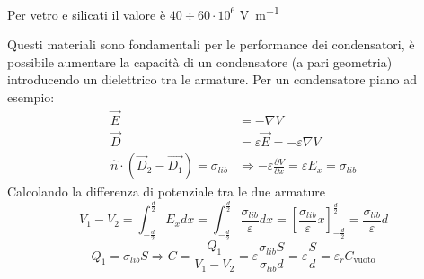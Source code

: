 Per vetro e silicati il valore è $40 \div 60 \cdot 10^6$
\si{\volt\per\meter} 

Questi materiali sono fondamentali per le performance dei condensatori,
è possibile aumentare la capacità di un condensatore (a pari geometria)
introducendo un dielettrico tra le armature. Per un condensatore
piano ad esempio:
\begin{align*}
\vec{E} &= -\nabla V \\
\vec{D} &= \varepsilon\vec{E} = -\varepsilon\nabla V \\
\hat{n}\cdot (\vec{D}_2-\vec{D_1}) = \sigma_{lib} &\Rightarrow -\varepsilon\frac{\partial V}{\partial x} = \varepsilon E_x = \sigma_{lib}
\end{align*}
Calcolando la differenza di potenziale tra le due armature
$$
V_1-V_2 = \int_{-\frac{d}{2}}^{\frac{d}{2}}E_x dx =
\int_{-\frac{d}{2}}^{\frac{d}{2}}\frac{\sigma_{lib}}{\varepsilon}dx = 
\left[\frac{\sigma_{lib}}{\varepsilon}x \right]_{-\frac{d}{2}}^{\frac{d}{2}} = \frac{\sigma_{lib}}{\varepsilon}d
$$
$$
Q_1 = \sigma_{lib}S \Rightarrow C = \frac{Q_1}{V_1-V_2} = 
\varepsilon\frac{\sigma_{lib}S}{\sigma_{lib}d} = \varepsilon\frac{S}{d}
= \varepsilon_r C_{\text{vuoto}}
$$
